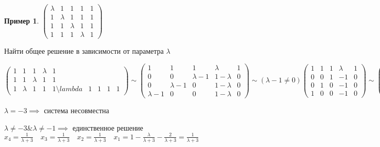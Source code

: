\documentclass{book}
\theoremstyle{definition}
\newtheorem*{example}{Пример}
\begin{document}
\begin{example}
    $\begin{pmatrix} \lambda&1&1&1&1\\1&\lambda&1&1&1\\1&1&\lambda&1&1\\1&1&1&\lambda&1 \end{pmatrix}$ 

    Найти общее решение в зависимости от параметра $\lambda$

    $\begin{pmatrix} 1&1&1&\lambda&1\\1&1&\lambda&1&1\\1&\lambda&1&1&1\setminus lambda&1&1&1&1 \end{pmatrix} \sim \begin{pmatrix} 1&1&1&\lambda&1\\0&0&\lambda-1&1-\lambda&0\\0&\lambda-1&0&1-\lambda&0\\ \lambda-1&0&0&1-\lambda&0 \end{pmatrix} \sim \left( \lambda-1\neq 0 \right) \begin{pmatrix} 1&1&1&\lambda&1\\0&0&1&-1&0\\0&1&0&-1&0\\1&0&0&-1&0 \end{pmatrix} \sim \begin{pmatrix} 1&1&1&\lambda&1\\0&1&0&-1&0\\0&0&1&-1&0\\0&-1&-1&-1-\lambda&-1 \end{pmatrix} \sim \begin{pmatrix} 1&1&1&\lambda\\ 0&1&0&-1&0\\0&0&1&-1&0\\0&0&-1&-2-\lambda&-1\end{pmatrix} \sim \begin{pmatrix} 1&1&1&\lambda&1\\0&1&0&-1&0\\0&0&1&-1&0\\0&0&0&-3-\lambda&-1 \end{pmatrix} $

    $\lambda=-3\implies $ система несовместна

    $\lambda\neq -3 \& \lambda\neq -1\implies $ единственное решение $x_4=\frac{1}{\lambda+3}\quad x_3 = \frac{1}{\lambda+3}\quad x_2=\frac{1}{\lambda+3}\quad x_1 = 1-\frac{\lambda}{\lambda+3} - \frac{2}{\lambda+3} = \frac{1}{\lambda+3}$ 


\end{example}
\end{document}
